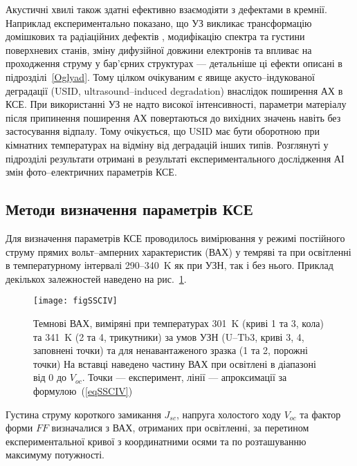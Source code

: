 Акустичні хвилі також здатні ефективно взаємодіяти з дефектами в кремнії.
Наприклад  експериментально показано, що УЗ викликає трансформацію домішкових та радіаційних дефектів \cite{Korotchenkov1995,Ostapenko1995,UST:Medvid,YOlikh:SupMicr},
модифікацію спектра \cite{Zaver:2008} та густини \cite{Mirsagatov} поверхневих станів,
зміну дифузійної довжини електронів \cite{Ostapenko1999,Ostrovskii2001}
та впливає на проходження струму у бар'єрних структурах \cite{Davletova2009,Davletova2008,YOlikh2005} ---
детальніше ці ефекти описані в підрозділі~\ref{Oglyad}.
 Тому цілком очікуваним є явище акусто--індукованої деградації (USID, ultrasound--induced degradation) внаслідок поширення АХ в КСЕ.
При використанні УЗ не надто високої інтенсивності, параметри матеріалу після припинення поширення АХ повертаються до вихідних значень \cite{Ostapenko1999,Ostrovskii2001,Korotchenkov1995} навіть без застосування відпалу.
Тому очікується, що USID має бути оборотною при кімнатних температурах на відміну від деградацій інших типів.
Розглянуті у підрозділі результати отримані в результаті експериментального дослідження АІ змін фото--електричних параметрів КСЕ.

\subsection{Методи визначення параметрів КСЕ\label{sbSSCMethod}}
Для визначення параметрів КСЕ проводилось вимірювання у режимі постійного струму прямих вольт--амперних характеристик (ВАХ) у темряві та при освітленні
в температурному інтервалі  290--340~K як при УЗН, так і без нього.
Приклад декількох залежностей наведено на рис.~\ref{figSSCIV}.
\begin{figure}
\center
\texttt{[image: figSSCIV]}%
\caption{\label{figSSCIV}
Темнові ВАХ, виміряні при температурах 301~K (криві 1 та 3, кола) та 341~K (2 та 4, трикутники)
за умов УЗН (U--Tb3, криві 3, 4, заповнені точки) та для ненавантаженого зразка (1 та 2, порожні точки)
На вставці наведено частину ВАХ при освітлені в діапазоні від 0 до $V_{oc}$.
Точки --- експеримент, лінії --- апроксимації за формулою~(\ref{eqSSCIV})
}%
\end{figure}
Густина струму короткого замикання $J_{sc}$, напруга холостого ходу $V_{oc}$ та фактор форми $F\!F$ визначалися з ВАХ, отриманих при освітленні,
за перетином експериментальної кривої з координатними осями  та по розташуванню максимуму потужності.

